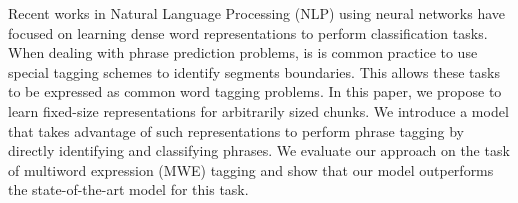 Recent works in Natural Language Processing (NLP) using neural networks have focused on learning dense word representations to perform classification tasks. When dealing with phrase prediction problems, is is common practice to use special tagging schemes to identify segments boundaries. This allows these tasks to be expressed as common word tagging problems. In this paper, we propose to learn fixed-size representations for arbitrarily sized chunks. We introduce a model that takes advantage of such representations to perform phrase tagging by directly identifying and classifying phrases. We evaluate our approach on the task of multiword expression (MWE) tagging and show that our model outperforms the state-of-the-art model for this task.
